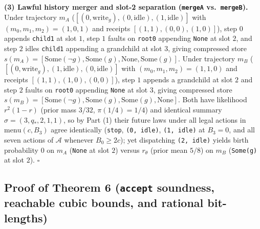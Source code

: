 \documentclass[11pt,a4paper]{article}
\begin{document}
\textbf{(3) Lawful history merger and slot-2 separation (\texttt{mergeA}
vs.~\texttt{mergeB}).} Under trajectory \(m_A\)
(\([(0,\mathrm{write}_g), (0,\mathrm{idle}), (1,\mathrm{idle})]\) with
\((m_0,m_1,m_2) = (1,0,1)\) and receipts \([(1,1),(0,0),(1,0)]\)), step
\(0\) appends \texttt{child1} at slot \(1\), step \(1\) faults on
\texttt{root0} appending \texttt{None} at slot \(2\), and step \(2\)
idles \texttt{child1} appending a grandchild at slot \(3\), giving
compressed store
\(s(m_A) = [\mathrm{Some}(\neg g), \mathrm{Some}(g), \mathrm{None}, \mathrm{Some}(g)]\).
Under trajectory \(m_B\)
(\([(0,\mathrm{write}_g), (1,\mathrm{idle}), (0,\mathrm{idle})]\) with
\((m_0,m_1,m_2) = (1,1,0)\) and receipts \([(1,1),(1,0),(0,0)]\)), step
\(1\) appends a grandchild at slot \(2\) and step \(2\) faults on
\texttt{root0} appending \texttt{None} at slot \(3\), giving compressed
store
\(s(m_B) = [\mathrm{Some}(\neg g), \mathrm{Some}(g), \mathrm{Some}(g), \mathrm{None}]\).
Both have likelihood \(r^2(1-r)\) (prior mass \(3/32\),
\(\pi(1/4) = 1/4\)) and identical summary
\(\sigma = (3, q_*, 2, 1, 1)\), so by Part (1) their future laws under
all legal actions in \(\mathrm{menu}(c, B_3)\) agree identically
(\texttt{stop}, \texttt{(0,\ idle)}, \texttt{(1,\ idle)} at \(B_3 = 0\),
and all seven actions of \(\mathcal{A}\) whenever \(B_0 \ge 2c\)); yet
dispatching \texttt{(2,\ idle)} yields birth probability \(0\) on
\(m_A\) (\texttt{None} at slot \(2\)) versus \(r_\theta\) (prior mean
\(5/8\)) on \(m_B\) (\texttt{Some(g)} at slot \(2\)). \(\square\)

\subsection{\texorpdfstring{Proof of Theorem 6 (\texttt{accept}
soundness, reachable cubic bounds, and rational
bit-lengths)}{Proof of Theorem 6 (accept soundness, reachable cubic bounds, and rational bit-lengths)}}\label{proof-of-theorem-6-accept-soundness-reachable-cubic-bounds-and-rational-bit-lengths}
\end{document}
